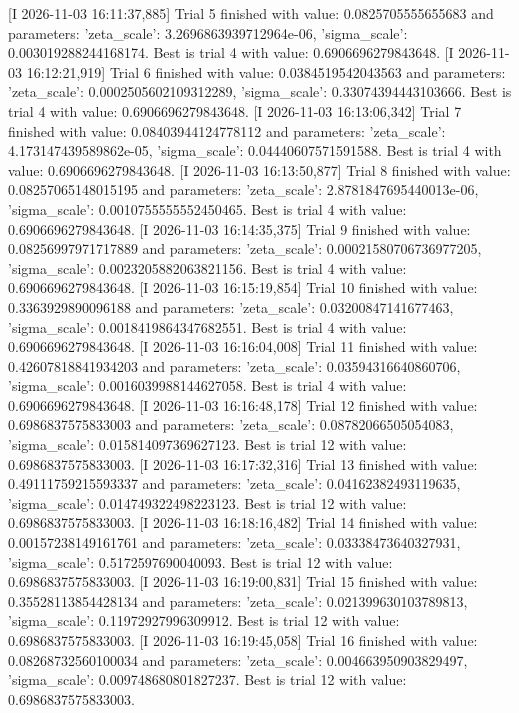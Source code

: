 [I 2026-11-03 16:11:37,885] Trial 5 finished with value: 0.0825705555655683 and parameters: {'zeta_scale': 3.2696863939712964e-06, 'sigma_scale': 0.003019288244168174}. Best is trial 4 with value: 0.6906696279843648.
[I 2026-11-03 16:12:21,919] Trial 6 finished with value: 0.0384519542043563 and parameters: {'zeta_scale': 0.0002505602109312289, 'sigma_scale': 0.33074394443103666}. Best is trial 4 with value: 0.6906696279843648.
[I 2026-11-03 16:13:06,342] Trial 7 finished with value: 0.08403944124778112 and parameters: {'zeta_scale': 4.173147439589862e-05, 'sigma_scale': 0.04440607571591588}. Best is trial 4 with value: 0.6906696279843648.
[I 2026-11-03 16:13:50,877] Trial 8 finished with value: 0.08257065148015195 and parameters: {'zeta_scale': 2.8781847695440013e-06, 'sigma_scale': 0.0010755555552450465}. Best is trial 4 with value: 0.6906696279843648.
[I 2026-11-03 16:14:35,375] Trial 9 finished with value: 0.08256997971717889 and parameters: {'zeta_scale': 0.00021580706736977205, 'sigma_scale': 0.0023205882063821156}. Best is trial 4 with value: 0.6906696279843648.
[I 2026-11-03 16:15:19,854] Trial 10 finished with value: 0.3363929890096188 and parameters: {'zeta_scale': 0.03200847141677463, 'sigma_scale': 0.0018419864347682551}. Best is trial 4 with value: 0.6906696279843648.
[I 2026-11-03 16:16:04,008] Trial 11 finished with value: 0.42607818841934203 and parameters: {'zeta_scale': 0.03594316640860706, 'sigma_scale': 0.0016039988144627058}. Best is trial 4 with value: 0.6906696279843648.
[I 2026-11-03 16:16:48,178] Trial 12 finished with value: 0.6986837575833003 and parameters: {'zeta_scale': 0.08782066505054083, 'sigma_scale': 0.015814097369627123}. Best is trial 12 with value: 0.6986837575833003.
[I 2026-11-03 16:17:32,316] Trial 13 finished with value: 0.49111759215593337 and parameters: {'zeta_scale': 0.04162382493119635, 'sigma_scale': 0.014749322498223123}. Best is trial 12 with value: 0.6986837575833003.
[I 2026-11-03 16:18:16,482] Trial 14 finished with value: 0.00157238149161761 and parameters: {'zeta_scale': 0.03338473640327931, 'sigma_scale': 0.5172597690040093}. Best is trial 12 with value: 0.6986837575833003.
[I 2026-11-03 16:19:00,831] Trial 15 finished with value: 0.35528113854428134 and parameters: {'zeta_scale': 0.021399630103789813, 'sigma_scale': 0.11972927996309912}. Best is trial 12 with value: 0.6986837575833003.
[I 2026-11-03 16:19:45,058] Trial 16 finished with value: 0.08268732560100034 and parameters: {'zeta_scale': 0.004663950903829497, 'sigma_scale': 0.009748680801827237}. Best is trial 12 with value: 0.6986837575833003.
